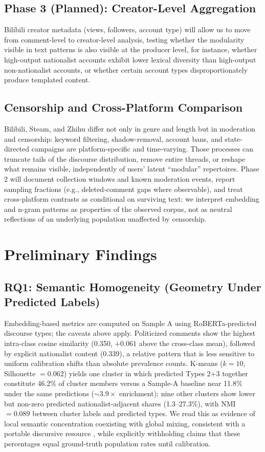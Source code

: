 \documentclass[man, 12pt, mask, floatsintext, nolmodern]{apa7}
\begin{document}
\subsection{Phase 3 (Planned): Creator-Level Aggregation}

Bilibili creator metadata (views, followers, account type) will allow us to move from comment-level to creator-level analysis, testing whether the modularity visible in text patterns is also visible at the producer level, for instance, whether high-output nationalist accounts exhibit lower lexical diversity than high-output non-nationalist accounts, or whether certain account types disproportionately produce templated content.

\subsection{Censorship and Cross-Platform Comparison}

Bilibili, Steam, and Zhihu differ not only in genre and length but in moderation and censorship: keyword filtering, shadow-removal, account bans, and state-directed campaigns are platform-specific and time-varying. Those processes can truncate tails of the discourse distribution, remove entire threads, or reshape what remains visible, independently of users' latent ``modular'' repertoires. Phase 2 will document collection windows and known moderation events, report sampling fractions (e.g., deleted-comment gaps where observable), and treat cross-platform contrasts as conditional on surviving text: we interpret embedding and n-gram patterns as properties of the observed corpus, not as neutral reflections of an underlying population unaffected by censorship.

\section{Preliminary Findings}

\subsection{RQ1: Semantic Homogeneity (Geometry Under Predicted Labels)}

Embedding-based metrics are computed on Sample A using RoBERTa-predicted discourse types; the caveats above apply. Politicized comments show the highest intra-class cosine similarity (0.350, $+0.061$ above the cross-class mean), followed by explicit nationalist content (0.339), a relative pattern that is less sensitive to uniform calibration shifts than absolute prevalence counts. K-means ($k = 10$, Silhouette $= 0.062$) yields one cluster in which predicted Types 2+3 together constitute 46.2\% of cluster members versus a Sample-A baseline near 11.8\% under the same predictions ($\sim 3.9\times$ enrichment); nine other clusters show lower but non-zero predicted nationalist-adjacent shares (1.3--27.3\%), with NMI $= 0.089$ between cluster labels and predicted types. We read this as evidence of local semantic concentration coexisting with global mixing, consistent with a portable discursive resource \parencite{hall1996}, while explicitly withholding claims that these percentages equal ground-truth population rates until calibration.
\end{document}

